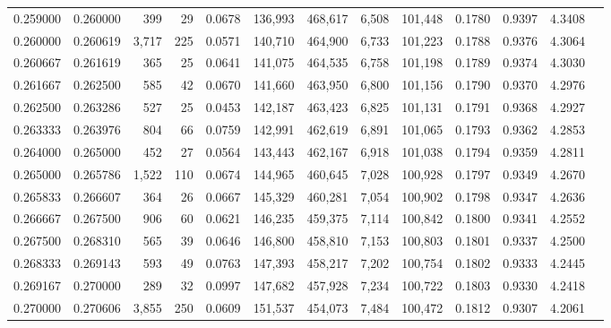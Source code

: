 \begin{tabular}{rrrrrrrrrrrrr}
0.259000 & 0.260000 &   399 &  29 &                                     0.0678 & 136,993 & 468,617 &   6,508 & 101,448 & 0.1780 & 0.9397 & 4.3408 \\
0.260000 & 0.260619 & 3,717 & 225 &                                     0.0571 & 140,710 & 464,900 &   6,733 & 101,223 & 0.1788 & 0.9376 & 4.3064 \\
0.260667 & 0.261619 &   365 &  25 &                                     0.0641 & 141,075 & 464,535 &   6,758 & 101,198 & 0.1789 & 0.9374 & 4.3030 \\
0.261667 & 0.262500 &   585 &  42 &                                     0.0670 & 141,660 & 463,950 &   6,800 & 101,156 & 0.1790 & 0.9370 & 4.2976 \\
0.262500 & 0.263286 &   527 &  25 &                                     0.0453 & 142,187 & 463,423 &   6,825 & 101,131 & 0.1791 & 0.9368 & 4.2927 \\
0.263333 & 0.263976 &   804 &  66 &                                     0.0759 & 142,991 & 462,619 &   6,891 & 101,065 & 0.1793 & 0.9362 & 4.2853 \\
0.264000 & 0.265000 &   452 &  27 &                                     0.0564 & 143,443 & 462,167 &   6,918 & 101,038 & 0.1794 & 0.9359 & 4.2811 \\
0.265000 & 0.265786 & 1,522 & 110 &                                     0.0674 & 144,965 & 460,645 &   7,028 & 100,928 & 0.1797 & 0.9349 & 4.2670 \\
0.265833 & 0.266607 &   364 &  26 &                                     0.0667 & 145,329 & 460,281 &   7,054 & 100,902 & 0.1798 & 0.9347 & 4.2636 \\
0.266667 & 0.267500 &   906 &  60 &                                     0.0621 & 146,235 & 459,375 &   7,114 & 100,842 & 0.1800 & 0.9341 & 4.2552 \\
0.267500 & 0.268310 &   565 &  39 &                                     0.0646 & 146,800 & 458,810 &   7,153 & 100,803 & 0.1801 & 0.9337 & 4.2500 \\
0.268333 & 0.269143 &   593 &  49 &                                     0.0763 & 147,393 & 458,217 &   7,202 & 100,754 & 0.1802 & 0.9333 & 4.2445 \\
0.269167 & 0.270000 &   289 &  32 &                                     0.0997 & 147,682 & 457,928 &   7,234 & 100,722 & 0.1803 & 0.9330 & 4.2418 \\
0.270000 & 0.270606 & 3,855 & 250 &                                     0.0609 & 151,537 & 454,073 &   7,484 & 100,472 & 0.1812 & 0.9307 & 4.2061 \\

\end{tabular}
